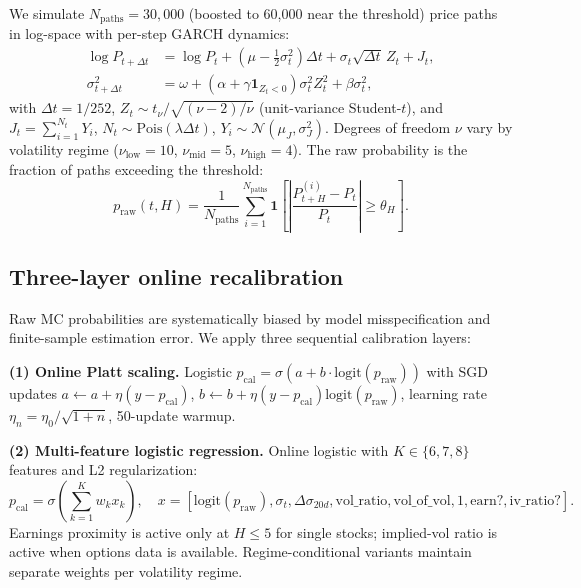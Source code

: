 \documentclass[11pt,a4paper]{article}
\newcommand{\pcal}{p_{\text{cal}}}
\newcommand{\praw}{p_{\text{raw}}}
\newcommand{\abs}[1]{\left|#1\right|}
\begin{document}
We simulate $N_\text{paths} = 30{,}000$ (boosted to 60{,}000 near the threshold) price paths in log-space with per-step GARCH dynamics:
\begin{align}
  \log P_{t+\Delta t} &= \log P_t + (\mu - \tfrac{1}{2}\sigma_t^2)\Delta t + \sigma_t\sqrt{\Delta t}\,Z_t + J_t, \\
  \sigma_{t+\Delta t}^2 &= \omega + (\alpha + \gamma\mathbf{1}_{Z_t<0})\sigma_t^2 Z_t^2 + \beta\sigma_t^2,
\end{align}
with $\Delta t = 1/252$, $Z_t \sim t_\nu / \sqrt{(\nu-2)/\nu}$ (unit-variance Student-$t$), and $J_t = \sum_{i=1}^{N_t} Y_i$, $N_t \sim \text{Pois}(\lambda\Delta t)$, $Y_i \sim \mathcal{N}(\mu_J, \sigma_J^2)$. Degrees of freedom $\nu$ vary by volatility regime ($\nu_\text{low}{=}10$, $\nu_\text{mid}{=}5$, $\nu_\text{high}{=}4$). The raw probability is the fraction of paths exceeding the threshold:
\begin{equation}
  \praw(t, H) = \frac{1}{N_\text{paths}} \sum_{i=1}^{N_\text{paths}} \mathbf{1}\!\left[\abs{\frac{P_{t+H}^{(i)} - P_t}{P_t}} \geq \theta_H\right].
\end{equation}

\subsection{Three-layer online recalibration}
\label{sec:calibration}

Raw MC probabilities are systematically biased by model misspecification and finite-sample estimation error. We apply three sequential calibration layers:

\textbf{(1) Online Platt scaling.} Logistic $\pcal = \sigma(a + b \cdot \text{logit}(\praw))$ with SGD updates $a \leftarrow a + \eta(y-\pcal)$, $b \leftarrow b + \eta(y-\pcal)\text{logit}(\praw)$, learning rate $\eta_n = \eta_0/\sqrt{1+n}$, 50-update warmup.

\textbf{(2) Multi-feature logistic regression.} Online logistic with $K \in \{6, 7, 8\}$ features and L2 regularization:
\begin{equation}
  \pcal = \sigma\!\left(\sum_{k=1}^{K} w_k x_k\right), \quad x = [\text{logit}(\praw), \sigma_t, \Delta\sigma_{20d}, \text{vol\_ratio}, \text{vol\_of\_vol}, 1, \text{earn?}, \text{iv\_ratio?}].
\end{equation}
Earnings proximity is active only at $H \leq 5$ for single stocks; implied-vol ratio is active when options data is available. Regime-conditional variants maintain separate weights per volatility regime.
\end{document}
